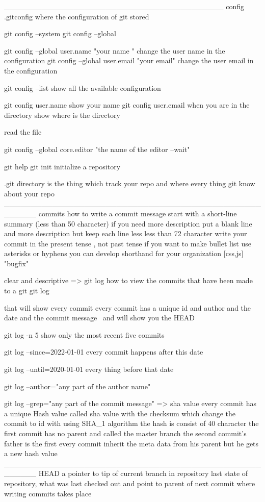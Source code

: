 _________________________________________
                       config
.gitconfig    where the configuration of git stored 

git config --system 
git config --global  

git config --global user.name  "your name "    change the user name in the configuration
git config --global user.email  "your email"    change the user email  in the configuration

git config --list  show all the available configuration

git config user.name    show your name 
git config user.email  
 when you are in the directory 
 show where is the directory 

 read the file 

 git config --global core.editor "the name of the editor --wait"

 git help 
 git init   initialize a repository

.git   directory  is the thing which track your repo  and where every thing git know about your repo 
______________________________________________________
                        commits
how to write a commit message
start  with a short-line summary (less than 50 character)
if you need more description 
put a blank line 
and more description 
but keep each line less less than 72 character 
write your commit in the present tense , not past tense 
if you want to make bullet list  use asterisks or hyphens
you can develop shorthand for your organization 
[css,js]
"bugfix"

clear and descriptive 
=>      git log 
how to view the commits that have been made to a git 
git log 

that will show every commit 
every commit has a unique id 
and author 
and the date 
and the commit message 
\
and will show you the HEAD

git log -n 5 
show only the most recent five commits 

git log --since=2022-01-01 
every commit happens after this date 

git log --until=2020-01-01 
every thing before that date 

git log --author="any part of the author name" 

git log --grep="any part of the commit message"
=>   sha value
every commit has a unique  Hash  value  called sha value  
with the checksum   which change the commit to id with using SHA_1 algorithm 
the hash   is consist of  40 character 
the first commit has no parent   and called the master branch 
the second commit's father is the first 
every commit inherit the meta data from his parent but he gets a new hash value
______________________________________________________
HEAD 
a pointer to tip of current branch in repository 
last state of repository, what was last checked out 
and point to parent of next commit where writing commits takes place 

